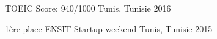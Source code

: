 



\begin{cvhonors}

  \cvhonor
    {TOEIC} %
    {Score: 940/1000} %
    {Tunis, Tunisie} %
    {2016} %

\end{cvhonors}




\begin{cvhonors}

  \cvhonor
	{1ère place} %
	{ENSIT Startup weekend} %
	{Tunis, Tunisie} %
	{2015} %
\end{cvhonors}

